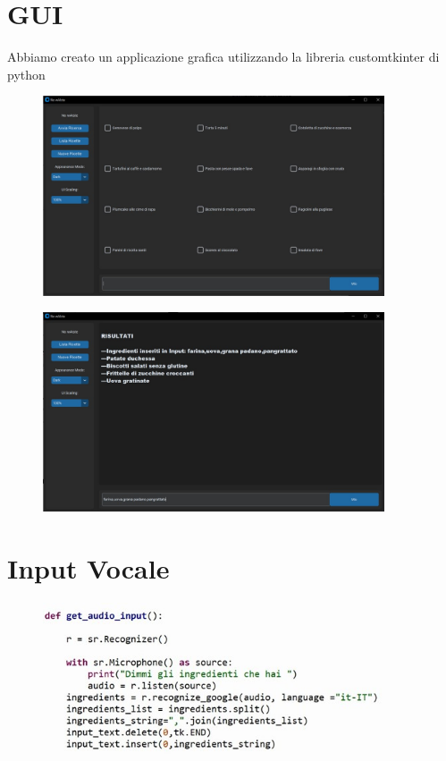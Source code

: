 \documentclass[12pt]{report}
\begin{document}
\section{GUI}
 Abbiamo creato un applicazione grafica utilizzando la libreria customtkinter di python

\begin{figure}[H]
        \centering
        {\includegraphics[width=0.9\textwidth]{img/img30.jpg}}
\end{figure}

\begin{figure}[H]
        \centering
        {\includegraphics[width=0.9\textwidth]{img/img31.jpg}}
\end{figure}

\section{Input Vocale}   
\begin{figure}[H]
        \centering
        {\includegraphics[width=0.9\textwidth]{img/img20.jpg}}
\end{figure}
\end{document}
